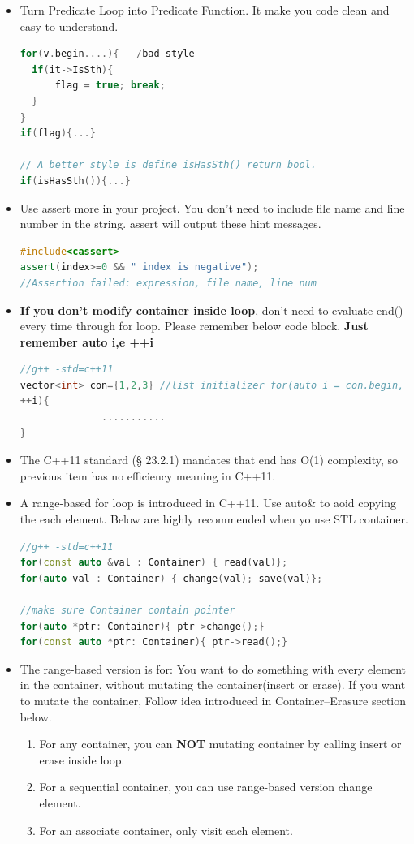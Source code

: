 \documentclass[a4paper,12pt,twoside]{book}
\begin{document}
\begin{itemize}
\item Turn Predicate Loop into Predicate Function. It make you code clean and easy to understand.

\begin{lstlisting}[frame=single, language=c++]
for(v.begin....){   /bad style
  if(it->IsSth){
      flag = true; break;
  }
}
if(flag){...}

// A better style is define isHasSth() return bool.
if(isHasSth()){...}
\end{lstlisting}

\item Use assert more in your project. You don't need to include file name and line number in the string. assert will output these hint messages.
\begin{lstlisting}[frame=single, language=c++]
#include<cassert>
assert(index>=0 && " index is negative");
//Assertion failed: expression, file name, line num
\end{lstlisting}

\item \textbf{If you don't modify container inside loop}, don't need to evaluate end() every time through for loop. Please remember below code block. \textbf{Just remember auto i,e ++i}
\begin{lstlisting}[frame=single, language=c++]
//g++ -std=c++11
vector<int> con={1,2,3} //list initializer for(auto i = con.begin, e = con.end();i!=e;
++i){
              ...........
}
\end{lstlisting}

\item The C++11 standard (§ 23.2.1) mandates that end has O(1) complexity, so previous item has no efficiency meaning in C++11.

\item A range-based for loop is introduced in C++11. Use auto\& to aoid copying the each element. Below are highly recommended when yo use STL container.

\begin{lstlisting}[frame=single, language=c++]
//g++ -std=c++11
for(const auto &val : Container) { read(val)};
for(auto val : Container) { change(val); save(val)};

//make sure Container contain pointer
for(auto *ptr: Container){ ptr->change();}
for(const auto *ptr: Container){ ptr->read();}
\end{lstlisting}
\item The range-based version is for: You want to do something with every element in the container, without mutating the container(insert or erase). If you want to mutate the container, Follow idea introduced in Container--Erasure section below.
\begin{enumerate}
\item For any container, you can \textbf{NOT} mutating container by calling insert or erase inside loop.
\item For a sequential container, you can use range-based version change element.
\item For an associate container, only visit each element.
\end{enumerate}


\end{itemize}
\end{document}
